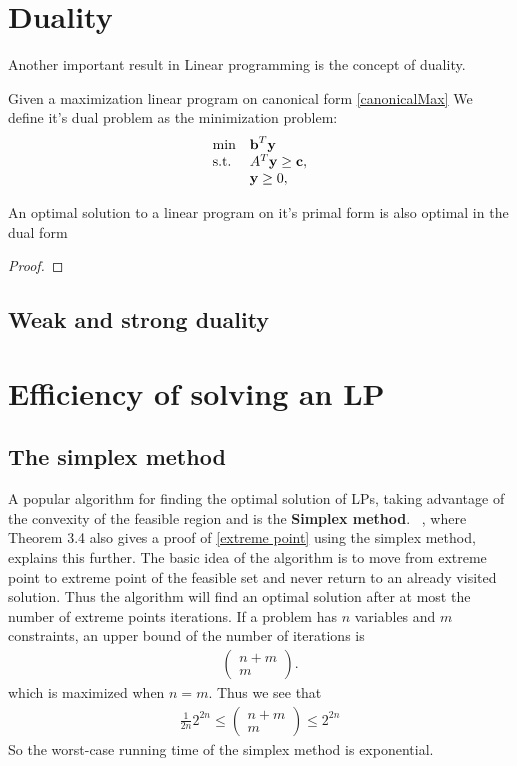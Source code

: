 \section{Duality}
Another important result in Linear programming is the concept of duality.
\begin{definition}
Given a maximization linear program on canonical form \ref{canonicalMax}
We define it's dual problem as the minimization problem:
\begin{align}\label{canonicalMaxDual}
\begin{array}{ll@{}ll}
\text{min} &\textbf{b}^T\textbf{y}&\\
\text{s.t.} &A^T\textbf{y} \geq \textbf{c},&\\
&\textbf{y} \geq 0,&\\
\end{array}
\end{align}
\end{definition}
\begin{theorem}
An optimal solution to a linear program on it's primal form is also optimal in the dual form
\begin{proof}
\end{proof}
\end{theorem}
\subsection{Weak and strong duality}
\fi
\section{Efficiency of solving an LP}
\subsection{The simplex method}
A popular algorithm for finding the optimal solution of LPs, taking advantage of the convexity of the feasible region and  is the \textbf{Simplex method}. ~\cite{vanderbei2015linear}, where Theorem 3.4 also gives a proof of \ref{extreme point} using the simplex method, explains this further. The basic idea of the algorithm is to move from extreme point to extreme point of the feasible set and never return to an already visited solution. Thus the algorithm will find an optimal solution after at most the number of extreme points iterations. If a problem has $n$ variables and $m$ constraints, an upper bound of the number of iterations is 
\begin{align*}
\begin{pmatrix}
n+m\\m
\end{pmatrix}.
\end{align*} 
which is maximized when $n=m$. Thus we see that 
\begin{align*}
\frac{1}{2n}2^{2n}\leq\begin{pmatrix}
n+m\\m
\end{pmatrix}\leq 2^{2n}
\end{align*}
So the worst-case running time of the simplex method is exponential.
